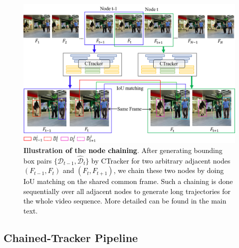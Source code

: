 \documentclass[../arXiv_main.tex]{subfiles}
\newcommand\CRwfb[1]{\textcolor{black}{#1}}
\newcommand{\CRyang}[1]{\textcolor{black}{#1}}
\begin{document}
\begin{figure}[t]
\centering
\includegraphics[width=0.9\columnwidth]{figure/model2.png}
\caption{\label{fig:model2}\textbf{Illustration \CRwfb{of} the \CRyang{node chaining}}. \CRyang{After generating bounding box pairs $ \{\mathcal{D}_{t-1},\mathcal{\hat{D}}_{t}\}$ by CTracker for two arbitrary adjacent nodes $ (F_{t-1},F_{t})$ and $ (F_{t},F_{t+1})$, we chain these two nodes by doing IoU matching on the shared common frame. Such a chaining is done sequentially over all adjacent nodes to generate long trajectories for the whole video sequence. More detailed can be found in the main text.}}
\label{fig:chain}
\end{figure}

\subsection{Chained-Tracker Pipeline \label{subsection:chainedtracker}}
\end{document}
